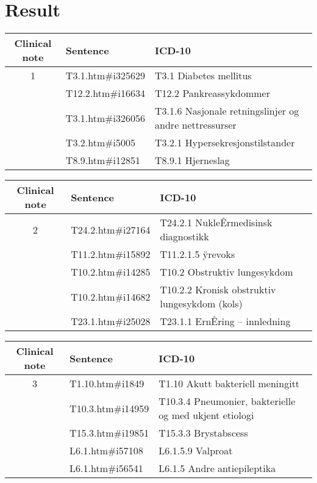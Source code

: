 \chapter{Result}
\label{cha:result}


\begin{table}[htbp]\footnotesize\center
\begin{tabular}{cll}
\toprule
Clinical note & Sentence & ICD-10 \\
\midrule
1 & T3.1.htm\#i325629  & T3.1 Diabetes mellitus \\
  & T12.2.htm\#i16634  & T12.2 Pankreassykdommer \\
  & T3.1.htm\#i326056  & T3.1.6 Nasjonale retningslinjer og andre nettressurser \\
  & T3.2.htm\#i5005    & T3.2.1 Hypersekresjonstilstander \\
  & T8.9.htm\#i12851   & T8.9.1 Hjerneslag \\
\bottomrule
\end{tabular}
\end{table}

\begin{table}[htbp]\footnotesize\center
\begin{tabular}{cll}
\toprule
Clinical note & Sentence & ICD-10 \\
\midrule
2 & T24.2.htm\#i27164  & T24.2.1 NukleÊrmedisinsk diagnostikk \\
  & T11.2.htm\#i15892  & T11.2.1.5 ÿrevoks \\
  & T10.2.htm\#i14285  & T10.2  Obstruktiv lungesykdom \\
  & T10.2.htm\#i14682  & T10.2.2 Kronisk obstruktiv lungesykdom (kols) \\
  & T23.1.htm\#i25028  & T23.1.1 ErnÊring – innledning \\
\bottomrule
\end{tabular}
\end{table}

\begin{table}[htbp]\footnotesize\center
\begin{tabular}{cll}
\toprule
Clinical note & Sentence & ICD-10 \\
\midrule
3 & T1.10.htm\#i1849   & T1.10 Akutt bakteriell meningitt \\
  & T10.3.htm\#i14959  & T10.3.4  Pneumonier, bakterielle og med ukjent etiologi \\
  & T15.3.htm\#i19851  & T15.3.3 Brystabscess \\
  & L6.1.htm\#i57108   & L6.1.5.9 Valproat \\
  & L6.1.htm\#i56541   & L6.1.5 Andre antiepileptika \\
\bottomrule
\end{tabular}
\end{table}


